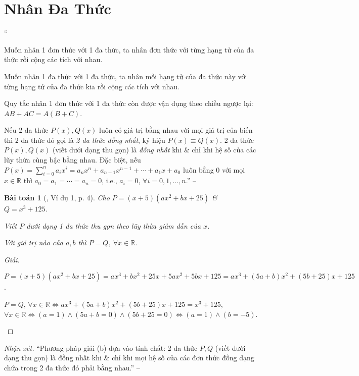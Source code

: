 \documentclass{article}
\numberwithin{equation}{section}
\newtheorem{baitoan}{Bài toán}[section]
\begin{document}
\section{Nhân Đa Thức}
``\begin{enumerate*}
	\item[\textbf{1.}] Muốn nhân 1 đơn thức với 1 đa thức, ta nhân đơn thức với từng hạng tử của đa thức rồi cộng các  tích với nhau.
	\item[\textbf{2.}] Muốn nhân 1 đa thức với 1 đa thức, ta nhân mỗi hạng tử của đa thức này với từng hạng tử của đa thức kia rồi cộng các tích với nhau.
	\item[\textbf{3.}] Quy tắc nhân 1 đơn thức với 1 đa thức còn được vận dụng theo chiều ngược lại: $AB + AC = A(B + C)$.
	\item[\textbf{4.}] Nếu 2 đa thức $P(x),Q(x)$ luôn có giá trị bằng nhau với mọi giá trị của biến thì 2 đa thức đó gọi là \textit{2 đa thức đồng nhất}, ký hiệu $P(x)\equiv Q(x)$. 2 đa thức $P(x),Q(x)$ (viết dưới dạng thu gọn) là \textit{đồng nhất} khi \& chỉ khi hệ số của các lũy thừa cùng bậc bằng nhau. Đặc biệt, nếu $P(x) = \sum_{i=0}^n a_ix^i = a_nx^n + a_{n-1}x^{n-1} + \cdots + a_1x + a_0$ luôn bằng $0$ với mọi $x\in\mathbb{R}$ thì $a_0 = a_1 = \cdots = a_n = 0$, i.e., $a_i = 0$, $\forall i = 0,1,\ldots,n$.'' -- \cite[Chap. 1, \S1, p. 4]{Tuyen_Toan_8}
\end{enumerate*}

\begin{baitoan}[\cite{Tuyen_Toan_8}, Ví dụ 1, p. 4]
	Cho $P = (x + 5)(ax^2 + bx + 25)$ \& $Q = x^3 + 125$.
	\begin{enumerate*}
		\item[(a)] Viết $P$ dưới dạng 1 đa thức thu gọn theo lũy thừa giảm dần của $x$.
		\item[(b)] Với giá trị nào của $a,b$ thì $P = Q$, $\forall x\in\mathbb{R}$.
	\end{enumerate*}	
\end{baitoan}

\begin{proof}[Giải]
	\begin{enumerate*}
		\item[(a)] $P = (x + 5)(ax^2 + bx + 25) = ax^3 + bx^2 + 25x + 5ax^2 + 5bx + 125 = ax^3 + (5a + b)x^2 + (5b + 25)x + 125$.
		\item[(b)] $P = Q$, $\forall x\in\mathbb{R}\Leftrightarrow ax^3 + (5a + b)x^2 + (5b + 25)x + 125 = x^3 + 125$, $\forall x\in\mathbb{R}\Leftrightarrow(a = 1)\land(5a + b = 0)\land(5b + 25 = 0)\Leftrightarrow(a = 1)\land(b = -5)$.
	\end{enumerate*}
\end{proof}
\noindent\textit{Nhận xét.} ``Phương pháp giải (b) dựa vào tính chất: 2 đa thức $P,Q$ (viết dưới dạng thu gọn) là đồng nhất khi \& chỉ khi mọi hệ số của các đơn thức đồng dạng chứa trong 2 đa thức đó phải bằng nhau.'' -- \cite[p. 5]{Tuyen_Toan_8}
\end{document}
